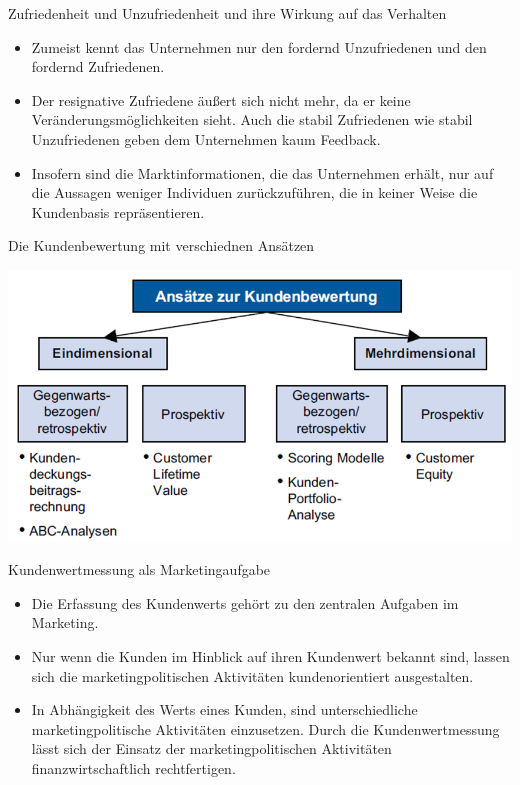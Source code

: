 \documentclass[12pt,ngerman,a4paper,ignorenonframetext,]{beamer}
\providecommand{\tightlist}{%
  \setlength{\itemsep}{0pt}\setlength{\parskip}{0pt}}
\begin{document}
\begin{frame}{Zufriedenheit und Unzufriedenheit und ihre Wirkung auf das
Verhalten}
\protect\hypertarget{zufriedenheit-und-unzufriedenheit-und-ihre-wirkung-auf-das-verhalten}{}

\begin{itemize}
\tightlist
\item
  Zumeist kennt das Unternehmen nur den fordernd Unzufriedenen und den
  fordernd Zufriedenen.
\item
  Der resignative Zufriedene äußert sich nicht mehr, da er keine
  Veränderungsmöglichkeiten sieht. Auch die stabil Zufriedenen wie
  stabil Unzufriedenen geben dem Unternehmen kaum Feedback.
\item
  Insofern sind die Marktinformationen, die das Unternehmen erhält, nur
  auf die Aussagen weniger Individuen zurückzuführen, die in keiner
  Weise die Kundenbasis repräsentieren.
\end{itemize}

\end{frame}

\begin{frame}{Die Kundenbewertung mit verschiednen Ansätzen}
\protect\hypertarget{die-kundenbewertung-mit-verschiednen-ansatzen}{}

\begin{center}\includegraphics[width=0.7\linewidth]{./images/Marketingcontrolling/Kundenbewertung} \end{center}

\end{frame}

\begin{frame}{Kundenwertmessung als Marketingaufgabe}
\protect\hypertarget{kundenwertmessung-als-marketingaufgabe}{}

\begin{itemize}
\tightlist
\item
  Die Erfassung des Kundenwerts gehört zu den zentralen Aufgaben im
  Marketing.
\item
  Nur wenn die Kunden im Hinblick auf ihren Kundenwert bekannt sind,
  lassen sich die marketingpolitischen Aktivitäten kundenorientiert
  ausgestalten.
\item
  In Abhängigkeit des Werts eines Kunden, sind unterschiedliche
  marketingpolitische Aktivitäten einzusetzen. Durch die
  Kundenwertmessung lässt sich der Einsatz der marketingpolitischen
  Aktivitäten finanzwirtschaftlich rechtfertigen.
\end{itemize}

\end{frame}
\end{document}

